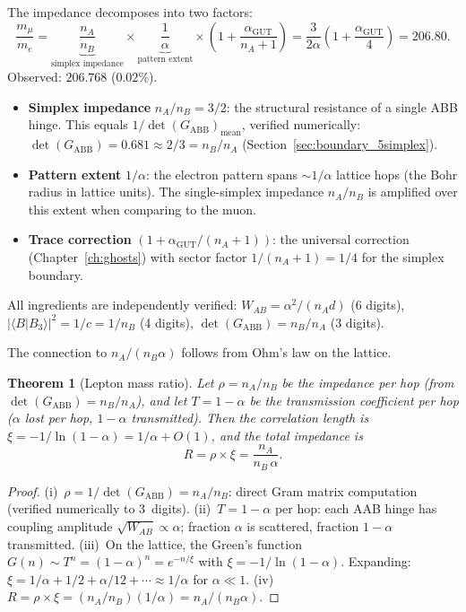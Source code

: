 \documentclass[12pt]{article}
\newtheorem{theorem}{Theorem}[section]
\theoremstyle{remark}
\theoremstyle{definition}
\begin{document}
The impedance decomposes into two factors:
\begin{equation}
\label{eq:mu_e}
\boxed{\frac{m_\mu}{m_e} = \underbrace{\frac{n_A}{n_B}}_{\text{simplex impedance}} \times \underbrace{\frac{1}{\alpha}}_{\text{pattern extent}} \times \left(1 + \frac{\alpha_\mathrm{GUT}}{n_A + 1}\right) = \frac{3}{2\alpha}\left(1 + \frac{\alpha_\mathrm{GUT}}{4}\right) = 206.80.}
\end{equation}
Observed: $206.768$ ($0.02\%$).

\begin{itemize}
\item \textbf{Simplex impedance} $n_A/n_B = 3/2$: the structural resistance of a single ABB hinge.  This equals $1/\det(G_\mathrm{ABB})_\mathrm{mean}$, verified numerically: $\det(G_\mathrm{ABB}) = 0.681 \approx 2/3 = n_B/n_A$ (Section~\ref{sec:boundary_5simplex}).

\item \textbf{Pattern extent} $1/\alpha$: the electron pattern spans $\sim 1/\alpha$ lattice hops (the Bohr radius in lattice units).  The single-simplex impedance $n_A/n_B$ is amplified over this extent when comparing to the muon.

\item \textbf{Trace correction} $(1 + \alpha_\mathrm{GUT}/(n_A+1))$: the universal correction (Chapter~\ref{ch:ghosts}) with sector factor $1/(n_A+1) = 1/4$ for the simplex boundary.
\end{itemize}

All ingredients are independently verified: $W_{AB} = \alpha^2/(n_A d)$ (6 digits), $|\langle B|B_3\rangle|^2 = 1/c = 1/n_B$ (4 digits), $\det(G_\mathrm{ABB}) = n_B/n_A$ (3 digits).

The connection to $n_A/(n_B\alpha)$ follows from Ohm's law on the lattice.

\begin{theorem}[Lepton mass ratio]
\label{thm:lepton_mass}
Let $\rho = n_A/n_B$ be the impedance per hop (from $\det(G_\mathrm{ABB}) = n_B/n_A$), and let $T = 1 - \alpha$ be the transmission coefficient per hop ($\alpha$ lost per hop, $1-\alpha$ transmitted).  Then the correlation length is $\xi = -1/\ln(1-\alpha) = 1/\alpha + O(1)$, and the total impedance is
\begin{equation}
R = \rho \times \xi = \frac{n_A}{n_B\,\alpha}.
\end{equation}
\end{theorem}

\begin{proof}
(i)~$\rho = 1/\det(G_\mathrm{ABB}) = n_A/n_B$: direct Gram matrix computation (verified numerically to 3~digits). (ii)~$T = 1 - \alpha$ per hop: each AAB hinge has coupling amplitude $\sqrt{W_{AB}} \propto \alpha$; fraction $\alpha$ is scattered, fraction $1-\alpha$ transmitted. (iii)~On the lattice, the Green's function $G(n) \sim T^n = (1-\alpha)^n = e^{-n/\xi}$ with $\xi = -1/\ln(1-\alpha)$.  Expanding: $\xi = 1/\alpha + 1/2 + \alpha/12 + \cdots \approx 1/\alpha$ for $\alpha \ll 1$. (iv)~$R = \rho \times \xi = (n_A/n_B)(1/\alpha) = n_A/(n_B\alpha)$.
\end{proof}
\end{document}
